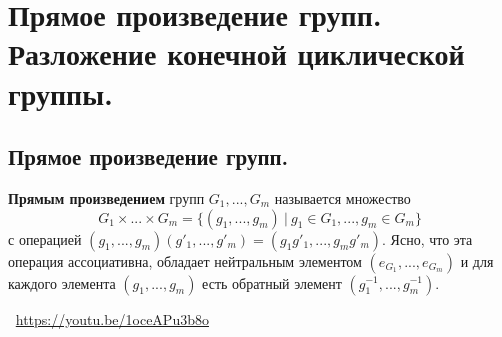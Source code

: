 \section{Прямое произведение групп. Разложение конечной циклической группы.}

\subsection{Прямое произведение групп.}
\begin{definition}
    \textbf{Прямым произведением} групп $G_1, ..., G_m$ называется множество
    \[
        G_1 \times ... \times G_m = \{ (g_1, ..., g_m) \> | \> g_1 \in G_1, ..., g_m \in G_m \}
    \]
    с операцией $(g_1, ..., g_m)(g'_1, ..., g'_m) = (g_1g'_1, ..., g_mg'_m)$.
    Ясно, что эта операция ассоциативна, обладает нейтральным элементом $(e_{G_1}, ..., e_{G_m})$ и для каждого элемента $(g_1, ..., g_m)$ есть обратный элемент $(g_1^{-1}, ..., g_m^{-1})$.
\end{definition}
\large \faYoutube \normalsize $\>$ \url{https://youtu.be/1oceAPu3b8o}

